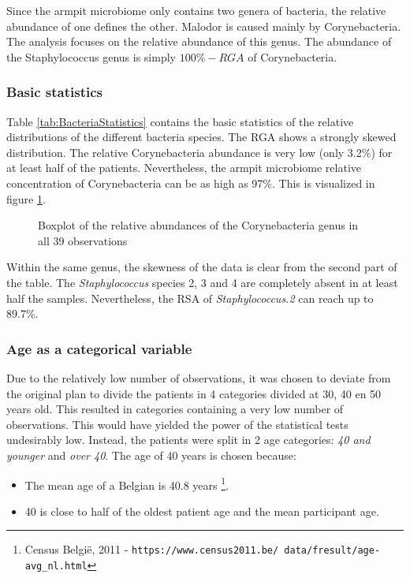 Since the armpit microbiome only contains two genera of bacteria, the relative abundance of one defines the other.
Malodor is caused mainly by Corynebacteria. 
The analysis focuses on the relative abundance of this genus.
The abundance of the Staphylococcus genus is simply $100\% - RGA$ of Corynebacteria.

\subsubsection{Basic statistics}
Table \ref{tab:BacteriaStatistics} contains the basic statistics of the relative distributions of the different bacteria species.
The RGA shows a strongly skewed distribution. 
The relative Corynebacteria abundance is very low (only 3.2\%) for at least half of the patients.
Nevertheless, the armpit microbiome relative concentration of Corynebacteria can be as high as 97\%. This is visualized in figure \ref{fig:boxplot_cory}.
\begin{figure}
    \centering
     \resizebox{\hsize}{!}{%
       
    }
    \caption{Boxplot of the relative abundances of the Corynebacteria genus in all 39 observations}
    \label{fig:boxplot_cory}
\end{figure}

Within the same genus, the skewness of the data is clear from the second part of the table.
The \textit{Staphylococcus} species 2, 3 and 4 are completely absent in at least half the samples. Nevertheless, the RSA of \textit{Staphylococcus.2} can reach up to 89.7\%.


\subsubsection{Age as a categorical variable \label{sec:AgeCategorical}}
Due to the relatively low number of observations, it was chosen to deviate from the original plan to divide the patients in 4 categories divided at 30, 40 en 50 years old.
This resulted in categories containing a very low number of observations. 
This would have yielded the power of the statistical tests undesirably low. 
Instead, the patients were split in 2 age categories: \textit{40 and younger} and \textit{over 40}.
The age of 40 years is chosen because:
\begin{itemize}
    \item The mean age of a Belgian is 40.8 years \footnote{Census Belgi\"e, 2011 -  \texttt{https://www.census2011.be/
    data/fresult/age-avg\_nl.html}}.
    \item 40 is close to half of the oldest patient age and the mean participant age.
\end{itemize}

